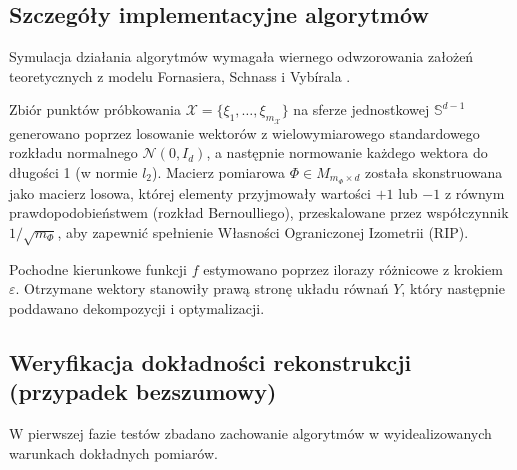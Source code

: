 \subsection{Szczegóły implementacyjne algorytmów}

Symulacja działania algorytmów wymagała wiernego odwzorowania założeń teoretycznych z modelu Fornasiera, Schnass i Vybírala \cite{fornasier2012learning}. 

Zbiór punktów próbkowania $\mathcal{X} = \{\xi_1, \dots, \xi_{m_\mathcal{X}}\}$ na sferze jednostkowej $\mathbb{S}^{d-1}$ generowano poprzez losowanie wektorów z wielowymiarowego standardowego rozkładu normalnego $\mathcal{N}(0, I_d)$, a następnie normowanie każdego wektora do długości 1 (w normie $l_2$). Macierz pomiarowa $\Phi \in M_{m_\Phi \times d}$ została skonstruowana jako macierz losowa, której elementy przyjmowały wartości $+1$ lub $-1$ z równym prawdopodobieństwem (rozkład Bernoulliego), przeskalowane przez współczynnik $1/\sqrt{m_\Phi}$, aby zapewnić spełnienie Własności Ograniczonej Izometrii (RIP).

Pochodne kierunkowe funkcji $f$ estymowano poprzez ilorazy różnicowe z krokiem $\varepsilon$. Otrzymane wektory stanowiły prawą stronę układu równań $Y$, który następnie poddawano dekompozycji i optymalizacji.

\subsection{Weryfikacja dokładności rekonstrukcji (przypadek bezszumowy)}

W pierwszej fazie testów zbadano zachowanie algorytmów w wyidealizowanych warunkach dokładnych pomiarów. 